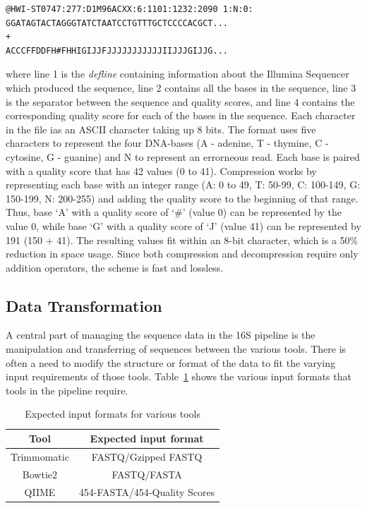 \documentclass[12pt]{article}
\begin{document}
	\lstset{
		numbers=right
	}
	\begin{lstlisting}
@HWI-ST0747:277:D1M96ACXX:6:1101:1232:2090 1:N:0:
GGATAGTACTAGGGTATCTAATCCTGTTTGCTCCCCACGCT...
+
ACCCFFDDFH#FHHIGIJJFJJJJJJJJJJJIIJJJGIJJG...
	\end{lstlisting}
	where line 1 is the \emph{defline} containing information about the Illumina
	Sequencer which produced the sequence, line 2 contains all the bases in the 
	sequence, line 3 is the separator between the sequence and quality scores, and 
	line 4 contains the corresponding quality score for each of the bases in the 
	sequence. Each character in the file ias an ASCII character taking up 8 bits. 
	The format uses five characters to represent the four DNA-bases (A - adenine, T - thymine,
	C - cytosine, G - guanine) and N to represent an errorneous read. Each base is paired
	with a quality score that has 42 values (0 to 41). Compression works by representing
	each base with an integer range (A: 0 to 49, T: 50-99, C: 100-149, G: 150-199, N: 200-255)
	and adding the quality score to the beginning of that range. Thus, base `A' with a 
	quality score of `\#' (value 0) can be represented by the value 0, while base `G' with
	a quality score of `J' (value 41) can be represented by 191 (150 + 41). The resulting
	values fit within an 8-bit character, which is a 50\% reduction in space usage. 
	Since both compression and decompression require only addition operators, the scheme
	is fast and lossless.

	
	\subsection{Data Transformation} %
	\label{sec:data_transformation}
	A central part of managing the sequence data in the 16S pipeline is the manipulation
	and transferring of sequences between the various tools. There is often a need
	to modify the structure or format of the data to fit the varying input requirements
	of those tools. Table~\ref{tab:expected_input} shows the various input formats that
	tools in the pipeline require.

	\begin{table}
		\centering
		\begin{tabular}{c|c}
		\hline
		Tool & Expected input format\\
		\hline
		Trimmomatic & FASTQ/Gzipped FASTQ\\
		\hline
		Bowtie2 & FASTQ/FASTA\\
		\hline
		QIIME & 454-FASTA/454-Quality Scores\\
		\hline
		\end{tabular}
		\caption{Expected input formats for various tools}
		\label{tab:expected_input}
	\end{table}
\end{document}
